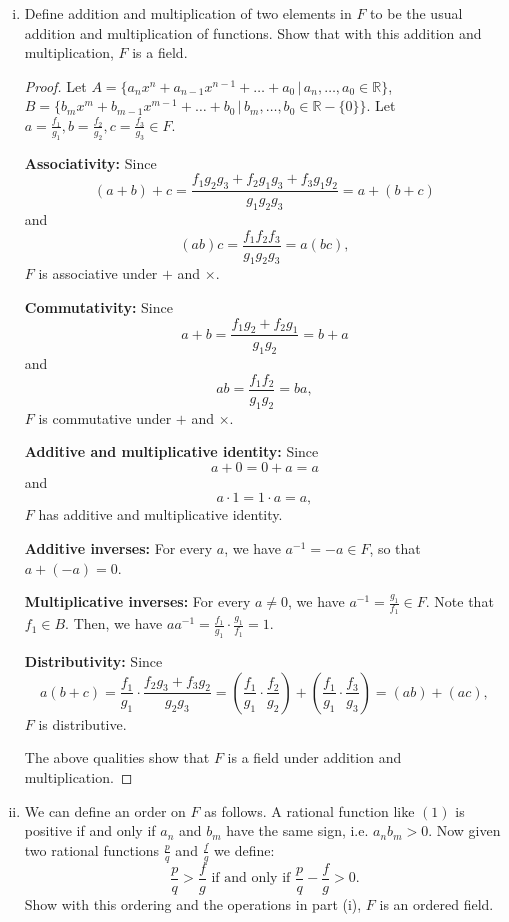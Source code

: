 \documentclass[addpoints, 11pt]{exam}
\newcommand*{\R}{\mathbb{R}}
\begin{document}
\begin{enumerate}[(i)]
    \color{crimson}
    \item  Define addition and multiplication of two elements in $F$ to be the usual addition and multiplication of functions. Show that with this addition and multiplication, $F$ is a field.
    \normalcolor
    
    \begin{proof}
        Let $A = \{a_nx^n + a_{n - 1}x^{n - 1} + \dots + a_0 \, | \, a_n, \dots , a_0 \in \R\}$, $B = \{b_mx^m + b_{m - 1}x^{m - 1} + \dots + b_0 \, | \, b_m , \dots , b_0 \in \R - \{0\}\}$. Let $a = \frac{f_1}{g_1}, b = \frac{f_2}{g_2}, c = \frac{f_3}{g_3} \in F$. 
        
        \textbf{Associativity:}
        Since
        \[
            (a + b) + c = \frac{f_1g_2g_3 + f_2g_1g_3 + f_3g_1g_2}{g_1g_2g_3} = a + (b + c)
        \]
        and
        \[
            (ab)c = \frac{f_1f_2f_3}{g_1g_2g_3} = a(bc),
        \]
        $F$ is associative under $+$ and $\times$.

        \textbf{Commutativity:} Since 
        \[
            a + b = \frac{f_1g_2 + f_2g_1}{g_1g_2} = b + a
        \] 
        and
        \[
            ab = \frac{f_1f_2}{g_1g_2} = ba,
        \]
        $F$ is commutative under $+$ and $\times$.

        \textbf{Additive and multiplicative identity:} Since
        \[
            a + 0 = 0 + a = a
        \]
        and
        \[
            a \cdot 1 = 1 \cdot a = a,
        \]
        $F$ has additive and multiplicative identity.

        \textbf{Additive inverses: } For every $a$, we have $a^{-1} = -a \in F$, so that $a + (-a) = 0$.

        \textbf{Multiplicative inverses: } For every $a \neq 0$, we have $a^{-1} = \frac{g_1}{f_1} \in F$. Note that $f_1 \in B$. Then, we have $aa^{-1} = \frac{f_1}{g_1} \cdot \frac{g_1}{f_1} = 1$.

        \textbf{Distributivity:} Since 
        \[
            a(b + c) = \frac{f_1}{g_1} \cdot \frac{f_2g_3 + f_3g_2}{g_2g_3} = (\frac{f_1}{g_1} \cdot \frac{f_2}{g_2}) + (\frac{f_1}{g_1} \cdot \frac{f_3}{g_3}) = (ab) + (ac),
        \]
        $F$ is distributive.

        The above qualities show that $F$ is a field under addition and multiplication.
    \end{proof}

    \color{crimson}
    \item  We can define an order on $F$ as follows. A rational function like $(1)$ is positive if and only if $a_n$ and $b_m$ have the same sign, i.e. $a_nb_m > 0$. Now given two rational functions $\frac{p}{q}$ and $\frac{f}{g}$ we define:
    \[
        \frac{p}{q} > \frac{f}{g} \text{ if and only if } \frac{p}{q} - \frac{f}{g} > 0.
    \]
    Show with this ordering and the operations in part (i), $F$ is an ordered field.
    \normalcolor
    

\end{enumerate}
\end{document}
